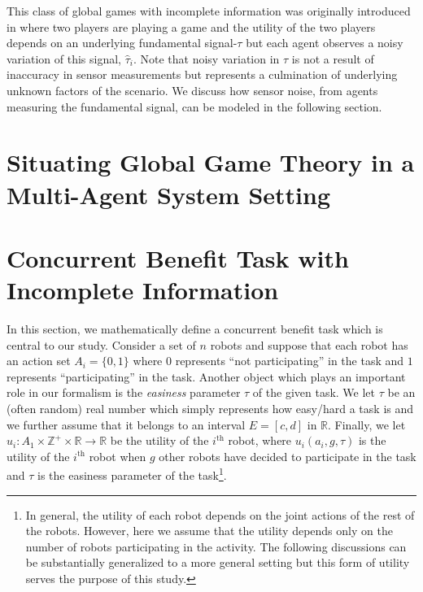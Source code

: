 \documentclass[conference]{ieeeconf}
\def\Z{\mathbb{Z}}
\def\R{\mathbb{R}}
\def\estt{\hat{\tau}}
\begin{document}
This class of global games with incomplete information was originally introduced in \cite{Carlsson1993} where two players are playing a game and the utility of the two players depends on an underlying fundamental signal-$\tau$ but each agent observes a noisy variation of this signal, $\estt_i$. Note that noisy variation in $\tau$ is not a result of inaccuracy in sensor measurements but represents a culmination of underlying unknown factors of the scenario. We discuss how sensor noise, from agents measuring the fundamental signal, can be modeled in the following section.

\section{Situating Global Game Theory in a Multi-Agent System Setting}\label{sec:ggmas}



\section{Concurrent Benefit Task with Incomplete Information}\label{sec:conbenefit}
In this section, we mathematically define a concurrent benefit task which is central to our study. Consider a set of $n$ robots and suppose that each robot has an action set $A_i=\{0,1\}$ where $0$ represents ``not participating'' in the task and $1$ represents ``participating'' in the task.  Another object which plays an important role in our formalism is the \textit{easiness} parameter $\tau$ of the given task. We let $\tau$ be an (often random) real number which simply represents how easy/hard a task is and we further assume that it belongs to an interval $E=[c,d]$ in $\R$.  Finally, we let $u_i:A_1\times\Z^+\times \R\to \R$ be the utility of the $i^{\text{th}}$ robot, where $u_i(a_i,g,\tau)$ is the utility of the $i^{\text{th}}$ robot when $g$ other robots have decided to participate in the task and $\tau$ is the easiness parameter of the task\footnote{In general, the utility of each robot depends on the joint actions of the rest of the robots. However, here we assume that the utility depends only on the number of robots participating in the activity. The following discussions can be substantially generalized to a more general setting but this form of utility serves the purpose of this study.}. 
\end{document}
